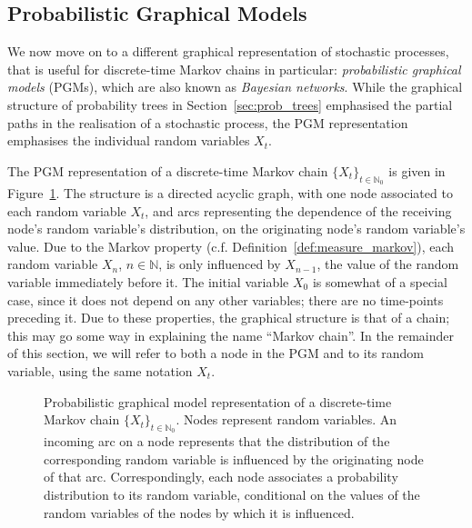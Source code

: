 \documentclass[graybox]{svmult}
\newcommand{\nats}{\mathbb{N}}
\newcommand{\natswith}{\nats_{0}}
\begin{document}
\subsection{Probabilistic Graphical Models}

We now move on to a different graphical representation of stochastic processes, that is useful for discrete-time Markov chains in particular: \emph{probabilistic graphical models} (PGMs), which are also known as \emph{Bayesian networks}. While the graphical structure of probability trees in Section~\ref{sec:prob_trees} emphasised the partial paths in the realisation of a stochastic process, the PGM representation emphasises the individual random variables $X_t$. 

The PGM representation of a discrete-time Markov chain $\{X_t\}_{t\in\natswith}$ is given in Figure~\ref{fig:example_markov_pgm}. The structure is a directed acyclic graph, with one node associated to each random variable $X_t$, and arcs representing the dependence of the receiving node's random variable's distribution, on the originating node's random variable's value. Due to the Markov property (c.f. Definition~\ref{def:measure_markov}), each random variable $X_n$, $n\in\nats$, is only influenced by $X_{n-1}$, the value of the random variable immediately before it. The initial variable $X_0$ is somewhat of a special case, since it does not depend on any other variables; there are no time-points preceding it. Due to these properties, the graphical structure is that of a chain; this may go some way in explaining the name ``Markov chain''. In the remainder of this section, we will refer to both a node in the PGM and to its random variable, using the same notation $X_t$.
\begin{figure}
\centering
{}
\caption{Probabilistic graphical model representation of a discrete-time Markov chain $\{X_t\}_{t\in\natswith}$. Nodes represent random variables. An incoming arc on a node represents that the distribution of the corresponding random variable is influenced by the originating node of that arc. Correspondingly, each node associates a probability distribution to its random variable, conditional on the values of the random variables of the nodes by which it is influenced.}
\label{fig:example_markov_pgm}
\end{figure}
\end{document}
